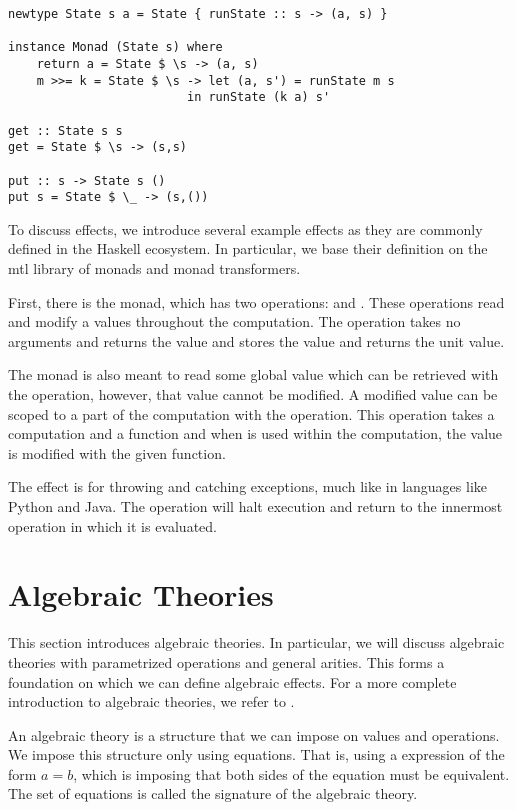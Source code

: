 \begin{lstlisting}
newtype State s a = State { runState :: s -> (a, s) }

instance Monad (State s) where
    return a = State $ \s -> (a, s)
    m >>= k = State $ \s -> let (a, s') = runState m s
                         in runState (k a) s'

get :: State s s
get = State $ \s -> (s,s)

put :: s -> State s ()
put s = State $ \_ -> (s,())
\end{lstlisting}

To discuss effects, we introduce several example effects as they are commonly defined in the Haskell ecosystem. In particular, we base their definition on the mtl library of monads and monad transformers.

First, there is the  monad, which has two operations:  and . These operations read and modify a values throughout the computation. The  operation takes no arguments and returns the value and  stores the value and returns the unit value.

The  monad is also meant to read some global value which can be retrieved with the  operation, however, that value cannot be modified. A modified value can be scoped to a part of the computation with the  operation. This operation takes a computation and a function and when  is used within the computation, the value is modified with the given function.

The  effect is for throwing and catching exceptions, much like in languages like Python and Java. The  operation will halt execution and return to the innermost  operation in which it is evaluated.

\section{Algebraic Theories}

This section introduces algebraic theories. In particular, we will discuss algebraic theories with parametrized operations and general arities. This forms a foundation on which we can define algebraic effects. For a more complete introduction to algebraic theories, we refer to \textcite{bauer_what_2018}.

An algebraic theory is a structure that we can impose on values and operations. We impose this structure only using equations. That is, using a expression of the form $a = b$, which is imposing that both sides of the equation must be equivalent. The set of equations is called the signature of the algebraic theory.


